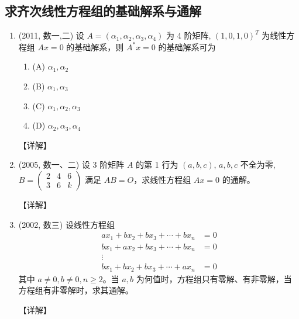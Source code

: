 \documentclass[12pt, a4paper, oneside, UTF8]{ctexbook}
\begin{document}
\subsection{求齐次线性方程组的基础解系与通解}

\begin{enumerate}[label=\arabic*.,start=2]
    \item (2011, 数一,二) 设 $A = (\alpha_1, \alpha_2, \alpha_3, \alpha_4)$ 为 4 阶矩阵, $(1,0,1,0)^T$ 为线性方程组 $Ax = 0$ 的基础解系，则 $A^* x = 0$ 的基础解系可为
    \begin{enumerate}
        \item (A) $\alpha_1, \alpha_2$
        \item (B) $\alpha_1, \alpha_3$
        \item (C) $\alpha_1, \alpha_2, \alpha_3$
        \item (D) $\alpha_2, \alpha_3, \alpha_4$
    \end{enumerate}
    
    \begin{solution}
    【详解】
    \end{solution}
    
    \item (2005, 数一、二) 设 3 阶矩阵 $A$ 的第 1 行为 $(a, b, c)$, $a, b, c$ 不全为零, $B = \begin{pmatrix} 2 & 4 & 6 \\ 3 & 6 & k \end{pmatrix}$ 满足 $AB = O$，求线性方程组 $Ax = 0$ 的通解。
    
    \begin{solution}
    【详解】
    \end{solution}
    
    \item (2002, 数三) 设线性方程组
    \begin{align*}
    a x_1 + b x_2 + b x_3 + \cdots + b x_n &= 0 \\
    b x_1 + a x_2 + b x_3 + \cdots + b x_n &= 0 \\
    \vdots \\
    b x_1 + b x_2 + b x_3 + \cdots + a x_n &= 0
    \end{align*}
    其中 $a \neq 0, b \neq 0, n \geq 2$。当 $a, b$ 为何值时，方程组只有零解、有非零解，当方程组有非零解时，求其通解。
    
    \begin{solution}
    【详解】
    \end{solution}
\end{enumerate}
\end{document}
